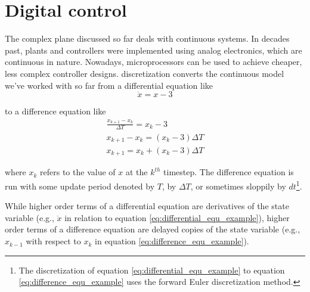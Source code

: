 
\chapter{Digital control} \label{ch:digital_control}

The complex plane discussed so far deals with continuous \glspl{system}. In
decades past, \glspl{plant} and controllers were implemented using analog
electronics, which are continuous in nature. Nowadays, microprocessors can be
used to achieve cheaper, less complex controller designs. \Gls{discretization}
converts the continuous \gls{model} we've worked with so far from a differential
equation like
\begin{equation}
  \dot{x} = x - 3 \label{eq:differential_equ_example}
\end{equation}

to a difference equation like
\begin{align}
  \frac{x_{k+1} - x_k}{\Delta T} = x_k - 3 \nonumber \\
  x_{k+1} - x_k = (x_k - 3) \Delta T \nonumber \\
  x_{k+1} = x_k + (x_k - 3) \Delta T \label{eq:difference_equ_example}
\end{align}

where $x_k$ refers to the value of $x$ at the $k^{th}$ timestep. The difference
equation is run with some update period denoted by $T$, by $\Delta T$, or
sometimes sloppily by $dt$\footnote{The discretization of equation
\eqref{eq:differential_equ_example} to equation
\eqref{eq:difference_equ_example} uses the forward Euler discretization
method.}.

While higher order terms of a differential equation are derivatives of the
\gls{state} variable (e.g., $\ddot{x}$ in relation to equation
\eqref{eq:differential_equ_example}), higher order terms of a difference
equation are delayed copies of the \gls{state} variable (e.g., $x_{k-1}$ with
respect to $x_k$ in equation \eqref{eq:difference_equ_example}).

\renewcommand*{\chapterpath}{\partpath/digital-control}







